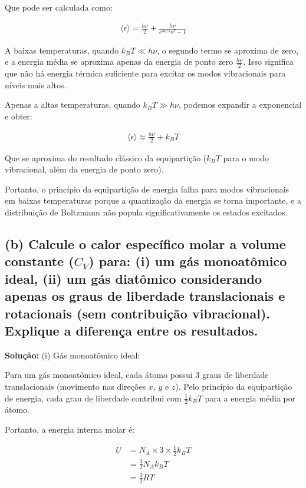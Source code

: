 \documentclass[fleqn,a4paper]{article}
\begin{document}
Que pode ser calculada como:

\begin{align}
\langle \epsilon \rangle = \frac{h\nu}{2} + \frac{h\nu}{e^{h\nu/k_B T} - 1}
\end{align}

A baixas temperaturas, quando $k_B T \ll h\nu$, o segundo termo se aproxima de zero, e a energia média se aproxima apenas da energia de ponto zero $\frac{h\nu}{2}$. Isso significa que não há energia térmica suficiente para excitar os modos vibracionais para níveis mais altos.

Apenas a altas temperaturas, quando $k_B T \gg h\nu$, podemos expandir a exponencial e obter:

\begin{align}
\langle \epsilon \rangle \approx \frac{h\nu}{2} + k_B T
\end{align}

Que se aproxima do resultado clássico da equipartição ($k_B T$ para o modo vibracional, além da energia de ponto zero).

Portanto, o princípio da equipartição de energia falha para modos vibracionais em baixas temperaturas porque a quantização da energia se torna importante, e a distribuição de Boltzmann não popula significativamente os estados excitados.

\subsection*{(b) Calcule o calor específico molar a volume constante ($C_V$) para: (i) um gás monoatômico ideal, (ii) um gás diatômico considerando apenas os graus de liberdade translacionais e rotacionais (sem contribuição vibracional). Explique a diferença entre os resultados.}

\textbf{Solução:}
(i) Gás monoatômico ideal:

Para um gás monoatômico ideal, cada átomo possui 3 graus de liberdade translacionais (movimento nas direções $x$, $y$ e $z$). Pelo princípio da equipartição de energia, cada grau de liberdade contribui com $\frac{1}{2}k_B T$ para a energia média por átomo.

Portanto, a energia interna molar é:

\begin{align}
U &= N_A \times 3 \times \frac{1}{2}k_B T \\
&= \frac{3}{2}N_A k_B T \\
&= \frac{3}{2}RT
\end{align}
\end{document}
